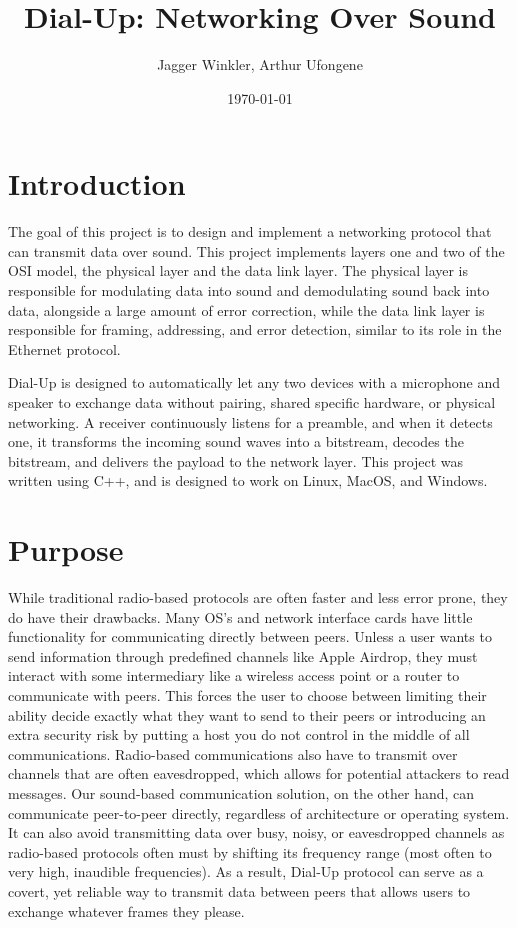 \documentclass{article}
\title{Dial-Up: Networking Over Sound}
\author{Jagger Winkler, Arthur Ufongene}
\date{\today}
\begin{document}
\maketitle

\section{Introduction}
The goal of this project is to design and implement a networking protocol that can transmit data over sound. 
This project implements layers one and two of the OSI model, the physical layer and the data link layer. 
The physical layer is responsible for modulating data into sound and demodulating sound back into data, alongside a large amount of error correction,
while the data link layer is responsible for framing, addressing, and error detection, similar to its role in the Ethernet protocol.

Dial-Up is designed to automatically let any two devices with a microphone and speaker to exchange data without pairing, shared specific hardware,
or physical networking. A receiver continuously listens for a preamble, and when it detects one, it transforms the incoming sound waves into a bitstream,
decodes the bitstream, and delivers the payload to the network layer. This project was written using C++, and is designed to work on Linux, MacOS, and Windows.

\section{Purpose}
While traditional radio-based protocols are often faster and less error prone, they do have their drawbacks. Many OS's and network interface cards have little functionality for communicating directly between peers. Unless a user wants to send information through predefined channels like Apple Airdrop, they must interact with some intermediary like a wireless access point or a router to communicate with peers. This forces the user to choose between limiting their ability decide exactly what they want to send to their peers or introducing an extra security risk by putting a host you do not control in the middle of all communications. Radio-based communications also have to transmit over channels that are often eavesdropped, which allows for potential attackers to read messages. Our sound-based communication solution, on the other hand, can communicate peer-to-peer directly, regardless of architecture or operating system. It can also avoid transmitting data over busy, noisy, or eavesdropped channels as radio-based protocols often must by shifting its frequency range (most often to very high, inaudible frequencies). As a result, Dial-Up protocol can serve as a covert, yet reliable way to transmit data between peers that allows users to exchange whatever frames they please.
\end{document}
